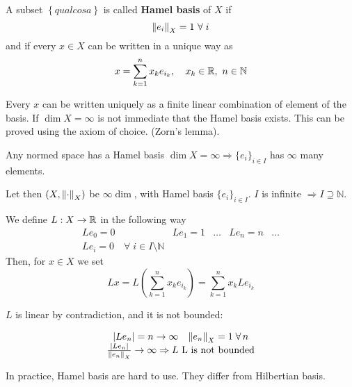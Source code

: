 \begin{definition}
    A subset \(\left\{ qualcosa \right\}\) is called \textbf{Hamel basis} of \(X\) if 
    \[
        \norm{e_i}_X = 1 \ \forall  \; i
    \]
    and if every \(x \in X\) can be written in a unique way as 
    \[
        x = \sum_{k=1}^n x_k e_{i_k}, \quad x_k \in \mathbb{R}, \ n \in \mathbb{N}
    \]
\end{definition}
Every \(x\) can be written uniquely as a finite linear combination of element of the basis.
If \(\dim X = \infty\) is not immediate that the Hamel basis exists. This can be proved using the axiom of choice. (Zorn's lemma). 

Any normed space has a Hamel basis \(\dim X = \infty \Rightarrow \{e_i\}_{i \in I}\) has \(\infty\) many elements.

Let then \((X, \norm{\cdot}_X)\) be \(\infty \dim\), with Hamel basis \(\{e_i \}_{i \in I}\). \(I\) is infinite \(\Rightarrow I \supseteq \mathbb{N}\).

We define \(L:X \to \mathbb{R}\) in the following way 
\[
    \begin{array}{ccccc}
        L e_0 = 0 & L e_1 = 1 & \dots & L e_n = n & \dots \\
        L e_i = 0 \quad \forall \; i \in I \setminus \mathbb{N} &&&&
    \end{array}
\]
Then, for \(x \in X\) we set
\[
    Lx = L \left( \sum_{k=1}^n x_k e_{i_k} \right) = \sum_{k=1}^n x_k L e_{i_k}
\]
 
\(L\) is linear by contradiction, and it is not bounded:

\[
    \begin{array}{c}
        \abs{L e_n} = n \to \infty \quad \norm{e_n }_X = 1 \; \forall\, n \\
        \frac{\abs{L e_n}}{\norm{e_n}_X} \to \infty \Rightarrow L \text{ L is not bounded}
    \end{array}
\]
\begin{remark}
    In practice, Hamel basis are hard to use. They differ from Hilbertian basis.
\end{remark}

